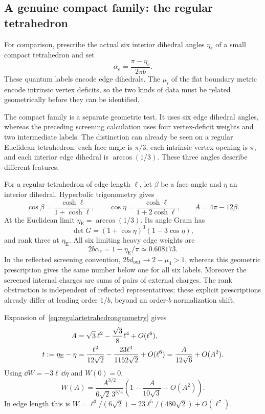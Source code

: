 \subsection{A genuine compact family: the regular tetrahedron}

For comparison, prescribe the actual six interior dihedral
angles $\eta_e$ of a small compact tetrahedron and set
\begin{equation}
 \alpha_e=\frac{\pi-\eta_e}{2\pi b}.
 \label{eq:actualtetrahedralcharges}
\end{equation}
These quantum labels encode edge dihedrals. The $\mu_i$ of the
flat boundary metric encode intrinsic vertex deficits, so the
two kinds of data must be related geometrically before they
can be identified.

The compact family is a separate geometric test. It uses six
edge dihedral angles, whereas the preceding screening calculation
uses four vertex-deficit weights and two intermediate labels.
The distinction can already be seen on a regular Euclidean
tetrahedron: each face angle is $\pi/3$, each intrinsic vertex
opening is $\pi$, and each interior edge dihedral is
$\arccos(1/3)$. These three angles describe different features.

For a regular tetrahedron of edge length $\ell$, let $\beta$
be a face angle and $\eta$ an interior dihedral. Hyperbolic
trigonometry gives
\begin{equation}
 \cos\beta=\frac{\cosh\ell}{1+\cosh\ell},\qquad
 \cos\eta=\frac{\cosh\ell}{1+2\cosh\ell},\qquad
 A=4\pi-12\beta.
 \label{eq:regulartetrahedrongeometry}
\end{equation}
At the Euclidean limit
$\eta_{\mathrm E}=\arccos(1/3)$. Its angle Gram has
\[
 \det G=(1+\cos\eta)^3(1-3\cos\eta),
\]
and rank three at $\eta_{\mathrm E}$.
All six limiting heavy edge weights are
\[
 2b\alpha_e=1-\eta_{\mathrm E}/\pi\simeq0.608173.
\]
In the reflected screening convention,
$2bd_{\mathrm{out}}\to2-\mu_4>1$, whereas this geometric
prescription gives the same number below one for all six
labels. Moreover the screened internal charges are sums of
pairs of external charges. The rank obstruction is independent
of reflected representatives; these explicit prescriptions
already differ at leading order $1/b$, beyond an order-$b$
normalization shift.

Expansion of~\eqref{eq:regulartetrahedrongeometry} gives
\begin{align}
 A&=\sqrt3\,\ell^2-\frac{\sqrt3}{8}\ell^4+O(\ell^6),
 \notag\\
 t:=\eta_{\mathrm E}-\eta
   &=\frac{\ell^2}{12\sqrt2}
       -\frac{23\ell^4}{1152\sqrt2}+O(\ell^6)
     =\frac{A}{12\sqrt6}+O(A^2).
 \label{eq:regularareadihedral}
\end{align}
Using $\dd W=-3\ell\,\dd\eta$ and $W(0)=0$,
\begin{equation}
 \boxed{\quad
 W(A)=\frac{A^{3/2}}{6\sqrt2\,3^{3/4}}
       \left(1-\frac{A}{10\sqrt3}+O(A^2)\right).
 \quad}
 \label{eq:regularvolumebyarea}
\end{equation}
In edge length this is
$W=\ell^3/(6\sqrt2)-23\ell^5/(480\sqrt2)+O(\ell^7)$.

